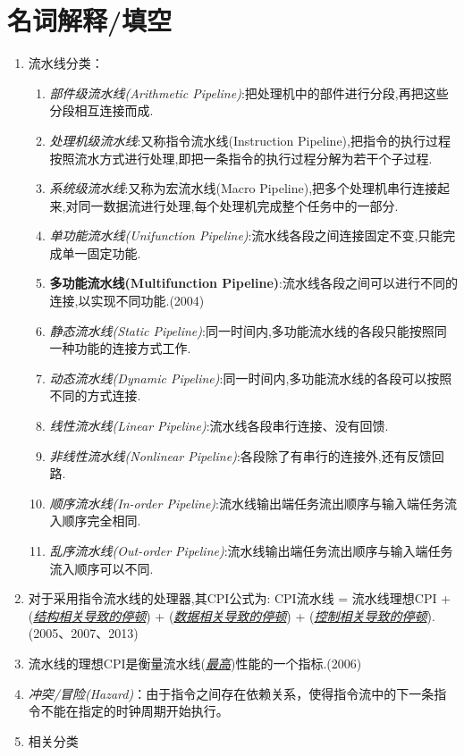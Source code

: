 \documentclass[a4paper]{ctexbook}
\begin{document}
\section{名词解释/填空}
\begin{enumerate}
  \item 流水线分类：
  \begin{enumerate}
    \item \emph{部件级流水线(Arithmetic Pipeline)}:把处理机中的部件进行分段,再把这些分段相互连接而成.
    \item \emph{处理机级流水线}:又称指令流水线(Instruction Pipeline),把指令的执行过程按照流水方式进行处理,即把一条指令的执行过程分解为若干个子过程.
    \item \emph{系统级流水线}:又称为宏流水线(Macro Pipeline),把多个处理机串行连接起来,对同一数据流进行处理,每个处理机完成整个任务中的一部分.
    \item \emph{单功能流水线(Unifunction Pipeline)}:流水线各段之间连接固定不变,只能完成单一固定功能.
    \item \textbf{多功能流水线(Multifunction Pipeline)}:流水线各段之间可以进行不同的连接,以实现不同功能.(2004)
    \item \emph{静态流水线(Static Pipeline)}:同一时间内,多功能流水线的各段只能按照同一种功能的连接方式工作.
    \item \emph{动态流水线(Dynamic Pipeline)}:同一时间内,多功能流水线的各段可以按照不同的方式连接.
    \item \emph{线性流水线(Linear Pipeline)}:流水线各段串行连接、没有回馈.
    \item \emph{非线性流水线(Nonlinear Pipeline)}:各段除了有串行的连接外,还有反馈回路.
    \item \emph{顺序流水线(In-order Pipeline)}:流水线输出端任务流出顺序与输入端任务流入顺序完全相同.
    \item \emph{乱序流水线(Out-order Pipeline)}:流水线输出端任务流出顺序与输入端任务流入顺序可以不同.
  \end{enumerate}
  \item 对于采用指令流水线的处理器,其CPI公式为: CPI流水线 = 流水线理想CPI + (\emph{\underline{结构相关导致的停顿}}) + (\emph{\underline{数据相关导致的停顿}}) + (\emph{\underline{控制相关导致的停顿}}).(2005、2007、2013)
  \item 流水线的理想CPI是衡量流水线(\emph{\underline{最高}})性能的一个指标.(2006)
  \item \emph{冲突/冒险(Hazard)}：由于指令之间存在依赖关系，使得指令流中的下一条指令不能在指定的时钟周期开始执行。
  \item 相关分类

\end{enumerate}
\end{document}
